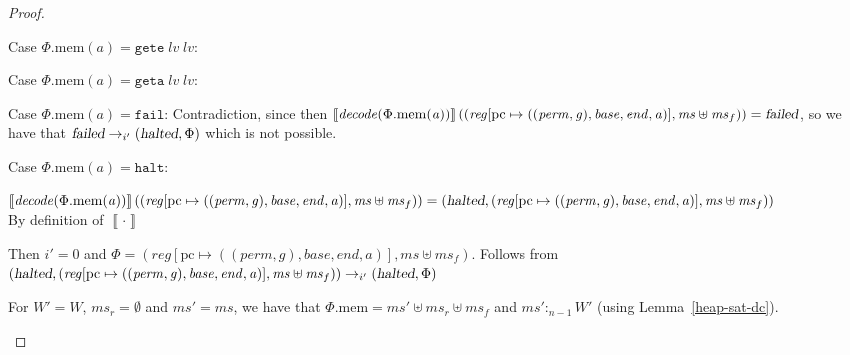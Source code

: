 \documentclass[a4paper]{article}
\newcommand{\update}[2]{[#1 \mapsto #2]}
\newcommand{\sem}[1]{\left\llbracket #1 \right\rrbracket}
\newcommand{\var}[1]{\mathit{#1}}
\newcommand{\hs}{\var{ms}}
\newcommand{\ms}{\hs}
\newcommand{\lv}{\var{lv}}
\newcommand{\gl}{\var{g}}
\newcommand{\pcreg}{\mathrm{pc}}
\newcommand{\addr}{\var{a}}
\newcommand{\start}{\var{base}}
\newcommand{\addrend}{\var{end}}
\newcommand{\reg}{\var{reg}}
\newcommand{\heap}{\var{mem}}
\newcommand{\perm}{\var{perm}}
\newcommand{\plainproj}[1]{\mathrm{#1}}
\newcommand{\memheap}[1][\Phi]{#1.\plainproj{mem}}
\newcommand{\failed}{\textsl{failed}}
\newcommand{\halted}{\textsl{halted}}
\newcommand{\plainfun}[2]{
  \ifthenelse{\equal{#2}{}}
  {\mathit{#1}}
  {\mathit{#1}(#2)}
}
\newcommand{\decode}{\plainfun{decode}{}}
\newcommand{\heapSat}[3][\heap]{#1 :_{#2} #3}
\newcommand{\zinstr}[1]{\mathtt{#1}}
\newcommand{\fail}{\zinstr{fail}}
\newcommand{\halt}{\zinstr{halt}}
\newcommand{\twoinstr}[3]{\zinstr{#1} \; #2 \; #3}
\newcommand{\geta}[2]{\twoinstr{geta}{#1}{#2}}
\newcommand{\gete}[2]{\twoinstr{gete}{#1}{#2}}
\newcommand{\step}[1][]{\rightarrow_{#1}}
\begin{document}
\begin{proof}
\begin{enumproof}
\begin{enumproof}
    \item Case $\memheap(a) = \gete{\lv}{\lv}$:
    \item Case $\memheap(a) = \geta{\lv}{\lv}$:
    \item Case $\memheap(a) = \fail$: Contradiction, since then
      $\sem{\decode(\memheap(\addr))}((\reg\update{\pcreg}{((\perm,\gl),\start,\addrend,\addr)},\hs
      \uplus \ms_f)) = \failed$, so we have that $\failed \step[i']
      (\halted,\Phi)$ which is not possible.
    \item Case $\memheap(a) = \halt$:
      \begin{enumproof}
      \item
        $\sem{\decode(\memheap(\addr))}((\reg\update{\pcreg}{((\perm,\gl),\start,\addrend,\addr)},\hs
        \uplus \ms_f)) = (\halted, (\reg\update{\pcreg}{((\perm,\gl),\start,\addrend,\addr)},\hs
        \uplus \ms_f))$\\
        By definition of $\sem{\cdot}$
      \item Then $i' = 0$ and $\Phi =
        (\reg\update{\pcreg}{((\perm,\gl),\start,\addrend,\addr)},\hs \uplus
        \ms_f)$. Follows from $(\halted,
        (\reg\update{\pcreg}{((\perm,\gl),\start,\addrend,\addr)},\hs \uplus
        \ms_f)) \step[i'] (\halted,\Phi)$
      \item For $W' = W$, $\ms_r = \emptyset$ and $\ms' = \ms$, we have that
        $\memheap[\Phi] = \hs' \uplus \hs_r \uplus \ms_f$ and
        $\heapSat[\hs']{n-1}{W'}$ (using Lemma~\ref{heap-sat-dc}).
      \end{enumproof}
    \end{enumproof}
  \end{enumproof}
\end{proof}
\end{document}

